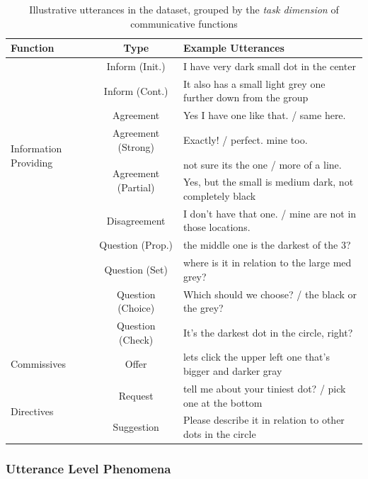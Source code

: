 \documentclass[letterpaper]{article} %
\begin{document}
\begin{table}[htb]
\centering
\begin{tabular}{lcl}
\toprule
Function & Type & Example Utterances\\
\midrule
\multirow{8}{*}{Information Providing} & \multirow{1}{*}{Inform (Init.)} & I have very dark small dot in the center \\
& \multirow{1}{*}{Inform (Cont.)} & It also has a small light grey one further down from the group \\
& \multirow{1}{*}{Agreement} & Yes I have one like that. / same here. \\
& \multirow{1}{*}{Agreement (Strong)} & Exactly! / perfect. mine too. \\
& \multirow{2}{*}{Agreement (Partial)} & not sure its the one / more of a line. \\
& & Yes, but the small is medium dark, not completely black \\
& \multirow{1}{*}{Disagreement} & I don't have that one. / mine are not in those locations. \\
\midrule
\multirow{4}{*}{Information Seeking} & \multirow{1}{*}{Question (Prop.)} & the middle one is the darkest of the 3? \\
& \multirow{1}{*}{Question (Set)} & where is it in relation to the large med grey? \\
& \multirow{1}{*}{Question (Choice)} & Which should we choose? / the black or the grey? \\
& \multirow{1}{*}{Question (Check)} & It's the darkest dot in the circle, right? \\
\midrule
\multirow{1}{*}{Commissives} & \multirow{1}{*}{Offer} & lets click the upper left one that's bigger and darker gray \\
\midrule
\multirow{2}{*}{Directives} & \multirow{1}{*}{Request} & tell me about your tiniest dot? / pick one at the bottom \\
& \multirow{1}{*}{Suggestion} & Please describe it in relation to other dots in the circle \\
\bottomrule
\end{tabular}
\caption{\label{speechact}
Illustrative utterances in the dataset, grouped by the \emph{task dimension} of communicative functions \cite{bunt2017dialogue}}
\end{table}

\subsubsection{Utterance Level Phenomena}
\end{document}
